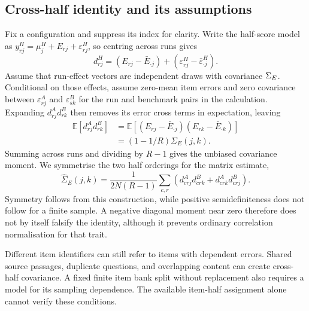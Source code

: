 \subsection{Cross-half identity and its assumptions}
Fix a configuration and suppress its index for clarity. Write the half-score model as $y^H_{rj}=\mu^H_j+E_{rj}+\varepsilon^H_{rj}$, so centring across runs gives
\begin{equation}
d^H_{rj}=(E_{rj}-\bar E_{\cdot j})+(\varepsilon^H_{rj}-\bar\varepsilon^H_{\cdot j}).
\end{equation}
Assume that run-effect vectors are independent draws with covariance $\Sigma_E$. Conditional on those effects, assume zero-mean item errors and zero covariance between $\varepsilon^A_{rj}$ and $\varepsilon^B_{sk}$ for the run and benchmark pairs in the calculation. Expanding $d^A_{rj}d^B_{rk}$ then removes its error cross terms in expectation, leaving
\begin{align}
\mathbb E[d^A_{rj}d^B_{rk}]
&=\mathbb E[(E_{rj}-\bar E_{\cdot j})(E_{rk}-\bar E_{\cdot k})]\\
&=(1-1/R)\Sigma_E(j,k).
\end{align}
Summing across runs and dividing by $R-1$ gives the unbiased covariance moment. We symmetrise the two half orderings for the matrix estimate,
\begin{equation}
\widehat\Sigma_E(j,k)=\frac{1}{2N(R-1)}\sum_{c,r}
\left(d^A_{crj}d^B_{crk}+d^A_{crk}d^B_{crj}\right).
\end{equation}
Symmetry follows from this construction, while positive semidefiniteness does not follow for a finite sample. A negative diagonal moment near zero therefore does not by itself falsify the identity, although it prevents ordinary correlation normalisation for that trait.

Different item identifiers can still refer to items with dependent errors. Shared source passages, duplicate questions, and overlapping content can create cross-half covariance. A fixed finite item bank split without replacement also requires a model for its sampling dependence. The available item-half assignment alone cannot verify these conditions.

